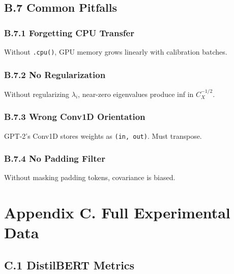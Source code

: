 \subsection{B.7 Common Pitfalls}

\subsubsection{B.7.1 Forgetting CPU Transfer}

Without \texttt{.cpu()}, GPU memory grows linearly with calibration batches.

\subsubsection{B.7.2 No Regularization}

Without regularizing $\lambda_i$, near-zero eigenvalues produce inf in 
$C_X^{-1/2}$.

\subsubsection{B.7.3 Wrong Conv1D Orientation}

GPT-2's Conv1D stores weights as \texttt{(in, out)}. Must transpose.

\subsubsection{B.7.4 No Padding Filter}

Without masking padding tokens, covariance is biased.


\section{Appendix C. Full Experimental Data}

\subsection{C.1 DistilBERT Metrics}

